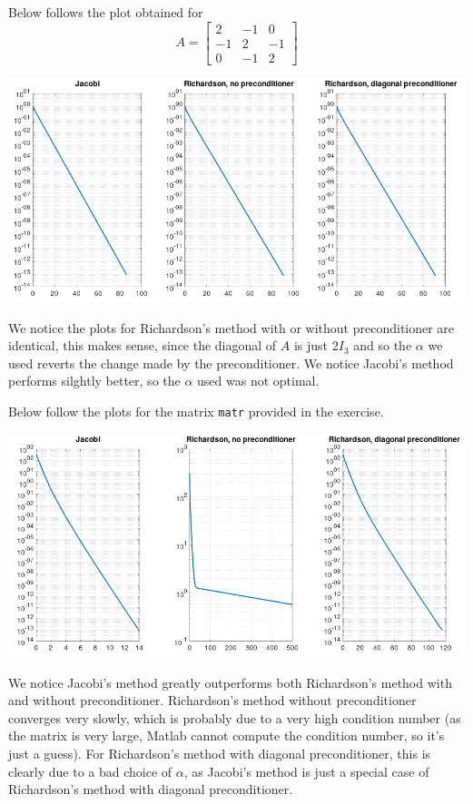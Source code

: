 \documentclass{article}
\begin{document}
Below follows the plot obtained for
\begin{equation*}
	A = 
	\begin{bmatrix}
		2 & -1 & 0\\
		-1 & 2 & -1\\
		0 & -1 & 2
	\end{bmatrix}
\end{equation*}

\begin{center}
	\includegraphics[width=\textwidth]{figure1.png}
\end{center}
We notice the plots for Richardson's method with or without
preconditioner are identical, this makes sense, since the diagonal
of $A$ is just $2I_3$ and so the $\alpha$ we used reverts the
change made by the preconditioner. We notice Jacobi's method
performs silghtly better, so the $\alpha$ used was not optimal.

Below follow the plots for the matrix \texttt{matr} provided in the
exercise.
\begin{center}
	\includegraphics[width=\textwidth]{figure2.png}
\end{center}
We notice Jacobi's method greatly outperforms both Richardson's
method with and without preconditioner.
Richardson's method without preconditioner converges very slowly,
which is probably due to a very high condition number (as
the matrix is very large, Matlab cannot compute the condition
number, so it's just a guess). For Richardson's method with
diagonal preconditioner, this is clearly due to a bad choice of
$\alpha$, as Jacobi's method is just a special case of
Richardson's method with diagonal preconditioner.
\end{document}
